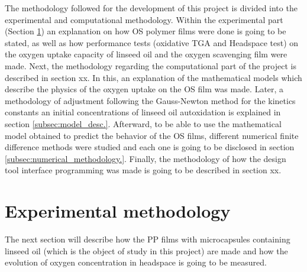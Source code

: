 \begin{refsection}

The methodology followed for the development of this project is divided into the experimental and computational methodology. Within the experimental part (Section \ref{sec:exp_methodology}) an explanation on how OS polymer films were done is going to be stated, as well as how performance tests (oxidative TGA and Headspace test) on the oxygen uptake capacity of linseed oil and the oxygen scavenging film were made. Next, the methodology regarding the computational part of the project is described in section xx.  In this, an explanation of the mathematical models which describe the physics of the oxygen uptake on the OS film was made. Later, a methodology of adjustment following the Gauss-Newton method 
for the kinetics constants an initial concentrations of linseed oil autoxidation is explained in section \ref{subsec:model_desc.}. Afterward, to be able to use the mathematical model obtained to predict the behavior of the OS films,  different numerical finite difference methods were studied and each one is going to be disclosed in section \ref{subsec:numerical_methodology.}. Finally, the methodology of how the design tool interface programming was made is going to be described in section xx. 
 

\section{Experimental methodology}\label{sec:exp_methodology}
The next section will describe how the PP films with microcapsules containing linseed oil (which is the object of study in this project) are made and how the evolution of oxygen concentration in headspace is going to be measured. 


\end{refsection}

